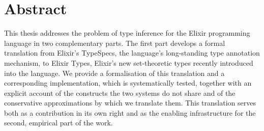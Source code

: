 \section*{Abstract}




This thesis addresses the problem of type inference for the Elixir programming language in two complementary parts.
The first part develops a formal translation from Elixir's TypeSpecs, the language's long-standing type annotation mechanism, to Elixir Types, Elixir's new set-theoretic types recently introduced into the language.
We provide a formalisation of this translation and a corresponding implementation, which is systematically tested, together with an explicit account of the constructs the two systems do not share and of the conservative approximations by which we translate them.
This translation serves both as a contribution in its own right and as the enabling infrastructure for the second, empirical part of the work.


